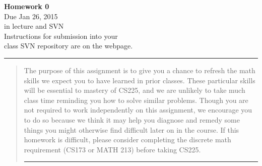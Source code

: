 \documentclass[11pt]{article}
\begin{document}

\begin{center}
\LARGE
\textbf{Homework 0}
\\[1ex]
\Large Due Jan 26, 2015 \\ in lecture and SVN \\ \large Instructions for submission into your \\ class SVN repository are on the webpage.
\end{center}

\bigskip\hrule
\begin{quote}
The purpose of this assignment is to give you  a chance to refresh the math
skills we expect you to have learned in prior classes.  These particular skills
will be essential to  mastery of CS225, and we are unlikely to take much class
time reminding you how to solve similar problems.  Though you are not required
to work independently on this assignment, we encourage you to do so because we
think it may help you diagnose and  remedy some things you might otherwise find
difficult later on in the course. If this homework is difficult, please consider
completing the discrete math requirement (CS173 or MATH 213) before taking CS225. 

\bigskip
\hrule %

\end{quote}
\end{document}
